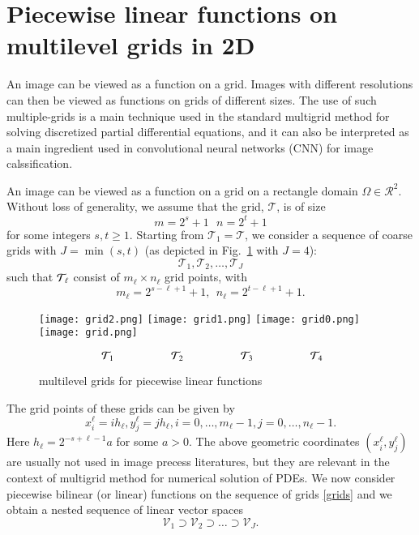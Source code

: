 \section{Piecewise linear functions on multilevel
  grids in 2D}\label{sec:functions}
An image can be viewed as a function on a grid.  Images with different
resolutions can then be viewed as functions on grids of different
sizes.  The use of such multiple-grids is a main technique used in the
standard multigrid method for solving discretized partial differential
equations, and it can also be interpreted as a main ingredient used in
convolutional neural networks (CNN) for image calssification.

An image can be viewed as a function on a grid \cite{krizhevsky2012imagenet} on 
a rectangle  domain $\Omega\in \mathcal R^2$.  Without loss of generality,
 we assume that the grid, $\mathcal T$, is of size
$$
m=2^{s}+1~~~n=2^{t}+1 
$$
for some integers $s, t\ge 1$.
Starting from $\mathcal T_1=\mathcal T$,  we consider a sequence of
coarse grids with $J=\min (s,t)$ (as depicted in Fig.~\ref{mgrid} with $J=4$):
\begin{equation}
\label{grids}
\mathcal T_1, \mathcal T_2, \ldots, \mathcal T_J
\end{equation}
such that ${\cal T}_\ell$ consist of $m_\ell\times n_\ell$ grid
points, with 
\begin{equation}
\label{mn-ell}
 m_\ell=2^{s-\ell+1}+1,~~ n_\ell=2^{t-\ell+1}+1.   
\end{equation}
\begin{figure}[!htbp]\label{mgrid}
	\begin{center}
		\texttt{[image: grid2.png]} \quad 
		\texttt{[image: grid1.png]} \quad 
		\texttt{[image: grid0.png]} \quad 
		\texttt{[image: grid.png]} 
	\end{center}
	$$ 
\hskip0.05 in \mathcal T_1\hskip 0.7in \mathcal T_2\hskip 0.7in  \mathcal T_3\hskip 0.7in \mathcal T_4
	$$
	\caption{multilevel grids for piecewise linear functions}
\end{figure}




The grid points of these grids can be given by
$$
x_i^{\ell}=i h_{\ell}, y_j^{\ell}=j h_{\ell},  i=0, \ldots, m_\ell-1,
j=0, \ldots, n_\ell-1.
$$
Here $h_{\ell} = 2^{-s + \ell -1}a$ for some $a >0$. The above geometric coordinates $(x_i^\ell, y_j^\ell)$
are usually not used in image precess literatures, but they are relevant
in the context of multigrid method for numerical solution of PDEs.
We now consider piecewise bilinear (or linear) functions on the sequence of grids
\eqref{grids} and we obtain a nested sequence of linear vector spaces
\begin{equation}
\label{Vk}
\mathcal V_1\supset\mathcal V_2\supset\ldots\supset \mathcal
V_J.
\end{equation}




